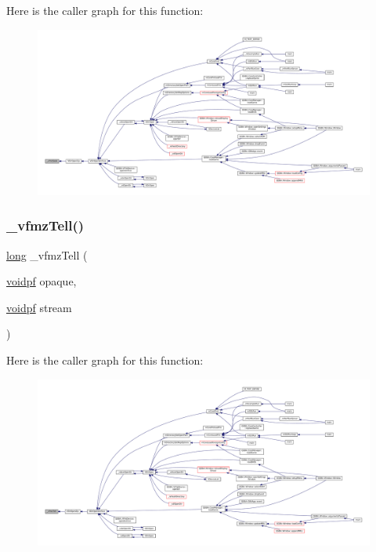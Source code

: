 Here is the caller graph for this function\+:
\nopagebreak
\begin{figure}[H]
\begin{center}
\leavevmode
\includegraphics[width=350pt]{vfs-zip_8c_a501af3b5e66d0e32bbde898125aa721d_icgraph}
\end{center}
\end{figure}
\mbox{\label{vfs-zip_8c_ade680b5fe0cf4d2c3c53419ebe6e5f87}} 
\subsubsection{\texorpdfstring{\+\_\+vfmz\+Tell()}{\_vfmzTell()}}
{\footnotesize\ttfamily \mbox{\hyperlink{ioapi_8h_a3c7b35ad9dab18b8310343c201f7b27e}{long}} \+\_\+vfmz\+Tell (\begin{DoxyParamCaption}\item[{\mbox{\hyperlink{ioapi_8h_a39ab6d73c1cd44bc17064c2dcbb3e753}{voidpf}}}]{opaque,  }\item[{\mbox{\hyperlink{ioapi_8h_a39ab6d73c1cd44bc17064c2dcbb3e753}{voidpf}}}]{stream }\end{DoxyParamCaption})}

Here is the caller graph for this function\+:
\nopagebreak
\begin{figure}[H]
\begin{center}
\leavevmode
\includegraphics[width=350pt]{vfs-zip_8c_ade680b5fe0cf4d2c3c53419ebe6e5f87_icgraph}
\end{center}
\end{figure}
\mbox{\label{vfs-zip_8c_a9984b3be64824e3b860d6fcb2ce2a2a3}} 
